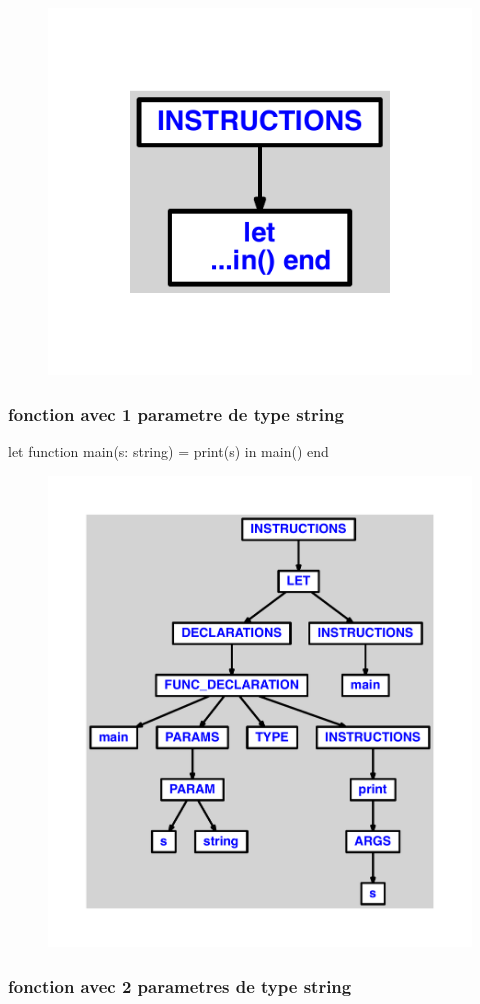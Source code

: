 \documentclass{article}
\begin{document}
\begin{figure}[H]\centering\includegraphics[max width=\textwidth]{ast/ast_230.pdf}\end{figure}\subsubsection{fonction avec 1 parametre de type string}
\begin{verbatimtab}
let
	function main(s: string) = print(s)
in main() end
\end{verbatimtab}
\begin{figure}[H]\centering\includegraphics[max width=\textwidth]{ast/ast_231.pdf}\end{figure}\subsubsection{fonction avec 2 parametres de type string}
\end{document}
